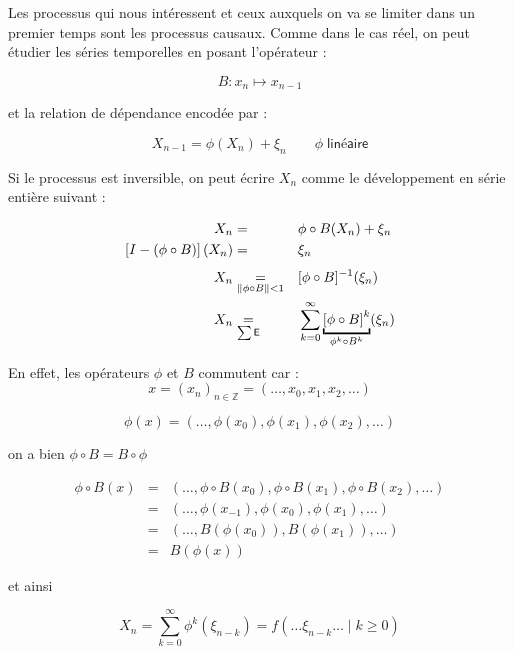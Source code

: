 \bigskip

Les processus qui nous intéressent et ceux auxquels on va se limiter dans un premier temps sont les processus causaux. Comme dans le cas réel, on peut étudier les séries temporelles en posant l'opérateur :

$$B : x_n \mapsto x_{n-1}$$

et la relation de dépendance encodée par :

$$X_{n-1} = \phi(X_n) + \xi_n \qquad \phi \; \textsf{linéaire}$$

Si le processus est inversible, on peut écrire $X_n$ comme le développement en série entière suivant :

\begin{align*}
    X_n                                  & =                                         && \phi \circ B(X_n) + \xi_n                                                                       \\
    \left[I - (\phi \circ B)\right](X_n) & \underset{\textsf{}} =                    && \xi_n
    \\
    X_n                                  & \underset{\Vert \phi \circ B \Vert < 1} = && \inverse{[\phi \circ B]} (\xi_n)
    \\
    X_n                                  & \underset{\sum \textsf{E}} =              && \sum\limits_{k=0}^\infty \underbracket{\left[ \phi \circ B \right]^k}_{\phi^k \circ B^k}(\xi_n)
\end{align*}


En effet, les opérateurs $\phi$ et $B$ commutent car :
$$x = (x_n)_{n \in \mathds Z} = (\dots , x_0, x_1, x_2, \dots)$$

$$\phi(x) = (\dots , \phi(x_0), \phi(x_1), \phi(x_2), \dots)$$

on a bien $\phi \circ B = B \circ \phi$

\begin{align*}
    \phi \circ B(x) & = & (\dots , \phi \circ B(x_0), \phi \circ B(x_1), \phi \circ B(x_2), \dots)
    \\
                    & = & (\dots, \phi(x_{-1}), \phi(x_0), \phi(x_1), \dots)
    \\
                    & = & (\dots, B\left(\phi(x_0)\right) , B(\phi(x_1)),\dots)
    \\
                    & = & B\left( \phi(x) \right)
\end{align*}


et ainsi

$$
    \boxed{
        X_n = \sum\limits_{k=0}^\infty \phi^k( \xi_{n-k} ) = f( \dots \xi_{n-k} \dots \; | \; k \geq 0)
    }
$$
